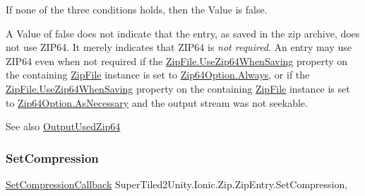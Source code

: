 If none of the three conditions holds, then the {\ttfamily Value} is false. 

A {\ttfamily Value} of false does not indicate that the entry, as saved in the zip archive, does not use Z\+I\+P64. It merely indicates that Z\+I\+P64 is {\itshape not required}. An entry may use Z\+I\+P64 even when not required if the \mbox{\hyperlink{class_super_tiled2_unity_1_1_ionic_1_1_zip_1_1_zip_file_aa6813ece810ffc34b633da96143383e6}{Zip\+File.\+Use\+Zip64\+When\+Saving}} property on the containing {\ttfamily \mbox{\hyperlink{class_super_tiled2_unity_1_1_ionic_1_1_zip_1_1_zip_file}{Zip\+File}}} instance is set to \mbox{\hyperlink{namespace_super_tiled2_unity_1_1_ionic_1_1_zip_a0c873ba2a5b73de966e876643830dc69a68eec46437c384d8dad18d5464ebc35c}{Zip64\+Option.\+Always}}, or if the \mbox{\hyperlink{class_super_tiled2_unity_1_1_ionic_1_1_zip_1_1_zip_file_aa6813ece810ffc34b633da96143383e6}{Zip\+File.\+Use\+Zip64\+When\+Saving}} property on the containing {\ttfamily \mbox{\hyperlink{class_super_tiled2_unity_1_1_ionic_1_1_zip_1_1_zip_file}{Zip\+File}}} instance is set to \mbox{\hyperlink{namespace_super_tiled2_unity_1_1_ionic_1_1_zip_a0c873ba2a5b73de966e876643830dc69a7bfa2d7f3d5b79692fe22a06113406c8}{Zip64\+Option.\+As\+Necessary}} and the output stream was not seekable. 

\begin{DoxySeeAlso}{See also}
\mbox{\hyperlink{class_super_tiled2_unity_1_1_ionic_1_1_zip_1_1_zip_entry_a1e1ef842a3e02644daeffa985f14ac11}{Output\+Used\+Zip64}}


\end{DoxySeeAlso}
\mbox{\label{class_super_tiled2_unity_1_1_ionic_1_1_zip_1_1_zip_entry_aa1417136aad30c1392834ce807438d58}} 
\subsubsection{\texorpdfstring{Set\+Compression}{SetCompression}}
{\footnotesize\ttfamily \mbox{\hyperlink{namespace_super_tiled2_unity_1_1_ionic_1_1_zip_ab6b15a72531220e6f98c46b594c9a849}{Set\+Compression\+Callback}} Super\+Tiled2\+Unity.\+Ionic.\+Zip.\+Zip\+Entry.\+Set\+Compression\hspace{0.3cm}{\ttfamily [get]}, {\ttfamily [set]}}



